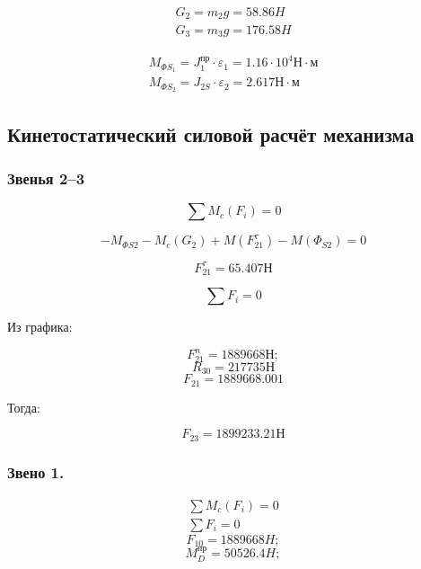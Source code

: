 \begin{eqnarray}
	G_2 = m_2 g = 58.86 H \\
	G_3 = m_3 g = 176.58 H
\end{eqnarray}

\begin{eqnarray}
	M_{\Phi S_1} = J_{1}^{пр} \cdot \varepsilon_1 = 1.16 \cdot 10^4 Н \cdot м\\
	M_{\Phi S_2} = J_{2S} \cdot \varepsilon_2 = 2.617 Н \cdot м
\end{eqnarray}

\subsection{Кинетостатический силовой расчёт механизма}

\subsubsection{Звенья 2--3}

\begin{equation}
	\sum M_c (F_i) = 0
\end{equation}

\begin{equation}
	-M_{\Phi S2} - M_c(G_2) + M(F_{21}^{\tau}) - M(\Phi_{S2}) = 0
\end{equation}

\begin{equation*}
	F_{21}^{\tau} = 65.407 Н
\end{equation*}

\begin{equation}
	\sum F_i = 0
\end{equation}

Из графика:

	$$F_{21}^{n} = 1889668 Н;$$
	$$R_{30} = 217735 Н $$
	$$F_{21} = 1889668.001$$

Тогда:

\begin{equation*}
	F_{23} = 1899233.21 Н
\end{equation*}

\subsubsection{Звено 1.}

\begin{eqnarray}
	\sum M_c (F_i) = 0\\
	\sum F_i = 0
\end{eqnarray}
	$$F_{10} = 1889668 H;$$
	$$M_D^{пр} = 50526.4 H;$$


